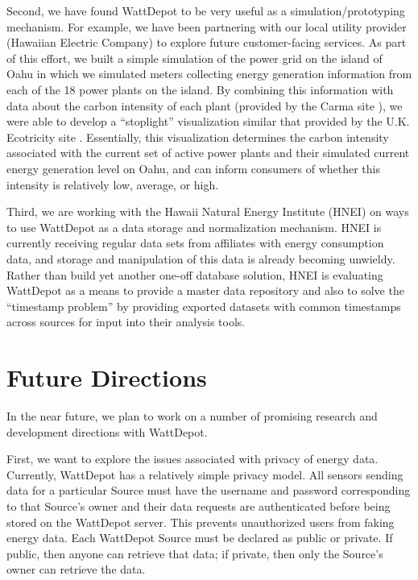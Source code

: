 \documentclass[conference]{IEEEtran}
\begin{document}
Second, we have found WattDepot to be very useful as a
simulation/prototyping mechanism.  For example, we have been partnering
with our local utility provider (Hawaiian Electric Company) to explore
future customer-facing services.  As part of this effort, we built a simple
simulation of the power grid on the island of Oahu in which we simulated
meters collecting energy
generation information from each of the 18 power plants on the island.  By
combining this information with data about the carbon intensity of each
plant (provided by the Carma site \cite{Carma}), we were able to develop a
``stoplight'' visualization similar that provided by the U.K. Ecotricity
site \cite{Ecotricity}.  Essentially, this visualization determines the
carbon intensity associated with the current set of active power plants and
their simulated current energy generation level on Oahu, and can inform
consumers of whether this intensity is relatively low, average, or high.

Third, we are working with the Hawaii Natural Energy Institute (HNEI) on
ways to use WattDepot as a data storage and normalization mechanism.  HNEI
is currently receiving regular data sets from affiliates with energy
consumption data, and storage and manipulation of this data is already
becoming unwieldy. Rather than build yet another one-off database solution,
HNEI is evaluating WattDepot as a means to provide a master data repository
and also to solve the ``timestamp problem'' by providing exported datasets
with common timestamps across sources for input into their analysis tools.

\section{Future Directions}

In the near future, we plan to work on a number of promising research and
development directions with WattDepot.

First, we want to explore the issues associated with privacy of energy
data.  Currently, WattDepot has a relatively simple privacy model.  All
sensors sending data for a particular Source must have the username and
password corresponding to that Source's owner and their data requests are
authenticated before being stored on the WattDepot server. This prevents
unauthorized users from faking energy data. Each WattDepot Source must be
declared as public or private.  If public, then anyone can retrieve that
data; if private, then only the Source's owner can retrieve the data.  
\end{document}
